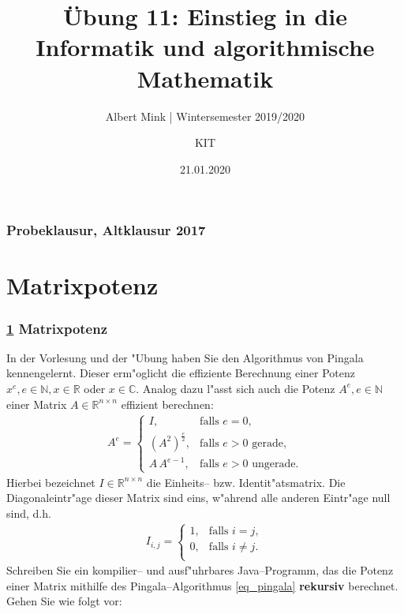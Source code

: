 \documentclass[c,18pt]{beamer}
\date{21.01.2020}
\title{Übung 11: Einstieg in die Informatik und algorithmische Mathematik}
\subtitle{Albert Mink | Wintersemester 2019/2020}
\author[Albert Mink, ]{KIT}
\institute[Institut für Angewandte und Numerische Mathematik (IANM)]{Institut für Angewandte und Numerische Mathematik}
\begin{document}
\begin{frame}
  \maketitle
\end{frame}

\begin{frame}
  \frametitle{Probeklausur, Altklausur 2017}%
\tableofcontents
\end{frame}

\def\stitle{Matrixpotenz}
\section{\stitle}\label{S:matrix}
\begin{frame}[t]%
  \frametitle{\ref{S:matrix} \stitle}
In der Vorlesung und der "Ubung haben Sie den Algorithmus von Pingala kennengelernt. Dieser erm"oglicht die
effiziente Berechnung einer Potenz $x^e, e\in\mathbb N, x\in\mathbb R$ oder $x\in\mathbb C$. Analog dazu
l"asst sich auch die Potenz $A^e, e\in\mathbb N$ einer Matrix $A\in\mathbb R^{n \times n}$ effizient
berechnen:
\begin{align}
 \label{eq_pingala}
 A^e =
  \begin{cases}
   I, & \text{falls } e=0,\\
   (A^2)^{\frac{e}{2}}, & \text{falls $e>0$ gerade},\\
   A\,A^{e-1}, & \text{falls $e>0$ ungerade}.
  \end{cases}
\end{align}
Hierbei bezeichnet $I\in\mathbb R^{n \times n}$ die Einheits-- bzw. Identit"atsmatrix. Die Diagonaleintr"age dieser
Matrix sind eins, w"ahrend alle anderen Eintr"age null sind, d.h.
\begin{align*}
 I_{i,j} =
 \begin{cases}
   1, &\text{falls } i=j,\\
   0, &\text{falls } i\neq j.\\
 \end{cases}
\end{align*}
Schreiben Sie ein kompilier-- und ausf"uhrbares Java--Programm, das die Potenz einer Matrix mithilfe des
Pingala--Algorithmus \eqref{eq_pingala} \textbf{rekursiv} berechnet. Gehen Sie wie folgt vor:\\[1em]

\end{frame}
\end{document}

